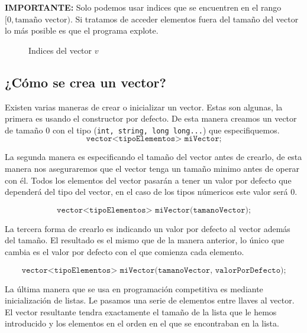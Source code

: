 \documentclass{article}
\begin{document}
    \textbf{IMPORTANTE:} Solo podemos usar indices que se encuentren en el rango $[0, \text{tamaño vector})$.
    Si tratamos de acceder elementos fuera del tamaño del vector lo más posible es que el programa explote.

    \begin{figure}[h]
        \centering
        \caption{Indices del vector $v$}
    \end{figure}

    \subsection{¿Cómo se crea un vector?}

    Existen varias maneras de crear o inicializar un vector. Estas son algunas, la primera es usando el constructor
    por defecto. De esta manera creamos un vector de tamaño 0 con el tipo (\texttt{int, string, long long...}) que especifiquemos.
    $$\texttt{vector<tipoElementos> miVector;}$$

    La segunda manera es especificando el tamaño del vector antes de crearlo, de esta manera nos aseguraremos que el vector
    tenga un tamaño minimo antes de operar con él. Todos los elementos del vector pasarán a tener un valor por defecto
    que dependerá del tipo del vector, en el caso de los tipos númericos este valor será 0.

    $$\texttt{vector<tipoElementos> miVector(tamanoVector);}$$

    La tercera forma de crearlo es indicando un valor por defecto al vector además del tamaño. El resultado es el mismo
    que de la manera anterior, lo único que cambia es el valor por defecto con el que comienza cada elemento. 

    $$\texttt{vector<tipoElementos> miVector(tamanoVector, valorPorDefecto);}$$

    La última manera que se usa en programación competitiva es mediante inicialización de listas. Le pasamos una serie
    de elementos entre llaves al vector. El vector resultante tendra exactamente el tamaño de la lista que le hemos
    introducido y los elementos en el orden en el que se encontraban en la lista.
\end{document}
